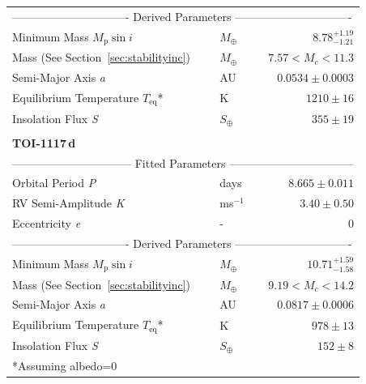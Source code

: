 \documentclass[fleqn,usenatbib,useAMS]{mnras}
\begin{document}
\begin{table}
\begin{tabular}{llr}
   \multicolumn{3}{l}{------------------------------- Derived Parameters -------------------------------}\\[2pt]
   Minimum Mass $M_\text{p}\sin{i}$ & $M_\oplus$ & $8.78^{+1.19}_{-1.21}$\\
   Mass (See Section~\ref{sec:stabilityinc}) & $M_\oplus$ & $7.57<M_c<11.3$\\
   Semi-Major Axis \textit{a} & AU & $0.0534\pm0.0003$\\
   Equilibrium Temperature $T_\text{eq}$* & K & $1210\pm16$\\
   Insolation Flux \textit{S} & $S_\oplus$ & $355\pm19$\\
   \\{\textbf{TOI-1117\,d}}\\
   \multicolumn{3}{l}{-------------------------------- Fitted Parameters ---------------------------------}\\[2pt]
   Orbital Period \textit{P} & days & $8.665\pm0.011$\\
   RV Semi-Amplitude \textit{K} & ms$^{-1}$ & $3.40\pm0.50$\\
   Eccentricity \textit{e} & - & 0\\
   \multicolumn{3}{l}{------------------------------- Derived Parameters -------------------------------}\\[2pt]
   Minimum Mass $M_\text{p}\sin{i}$ & $M_\oplus$ & $10.71^{+1.59}_{-1.58}$\\
   Mass (See Section~\ref{sec:stabilityinc}) & $M_\oplus$ & $9.19<M_c<14.2$\\
   Semi-Major Axis \textit{a} & AU & $0.0817\pm0.0006$\\
   Equilibrium Temperature $T_\text{eq}$* & K & $978\pm13$\\[2pt]
   Insolation Flux \textit{S} & $S_\oplus$ & $152\pm8$\\
   \hline
   \multicolumn{2}{l}{\footnotesize{*Assuming albedo=0}}
 \end{tabular}
\end{table}
\end{document}
